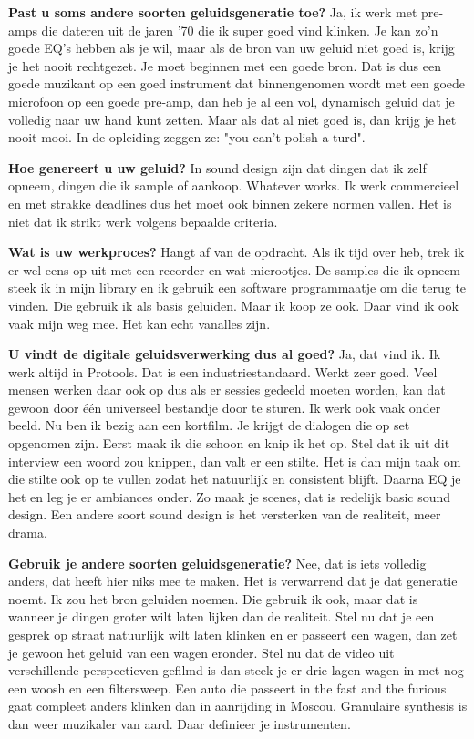 \textbf{Past u soms andere soorten geluidsgeneratie toe?}\newline
Ja, ik werk met pre-amps die dateren uit de jaren '70 die ik super goed vind klinken. Je kan zo'n goede EQ's hebben als je wil, maar als de bron van uw geluid niet goed is, krijg je het nooit rechtgezet.
Je moet beginnen met een goede bron.
Dat is dus een goede muzikant op een goed instrument dat binnengenomen wordt met een goede microfoon op een goede pre-amp, dan heb je al een vol, dynamisch geluid dat je volledig naar uw hand kunt zetten.
Maar als dat al niet goed is, dan krijg je het nooit mooi.
In de opleiding zeggen ze: "you can't polish a turd".

\textbf{Hoe genereert u uw geluid?}\newline
In sound design zijn dat dingen dat ik zelf opneem, dingen die ik sample of aankoop. Whatever works. Ik werk commercieel en met strakke deadlines dus het moet ook binnen zekere normen vallen.
Het is niet dat ik strikt werk volgens bepaalde criteria.

\textbf{Wat is uw werkproces?}\newline
Hangt af van de opdracht. Als ik tijd over heb, trek ik er wel eens op uit met een recorder en wat microotjes.
De samples die ik opneem steek ik in mijn library en ik gebruik een software programmaatje om die terug te vinden.
Die gebruik ik als basis geluiden. Maar ik koop ze ook. Daar vind ik ook vaak mijn weg mee.
Het kan echt vanalles zijn.

\textbf{U vindt de digitale geluidsverwerking dus al goed?}\newline
Ja, dat vind ik. Ik werk altijd in Protools. Dat is een industriestandaard. Werkt zeer goed.
Veel mensen werken daar ook op dus als er sessies gedeeld moeten worden, kan dat gewoon door één universeel bestandje door te sturen.
Ik werk ook vaak onder beeld. Nu ben ik bezig aan een kortfilm.
Je krijgt de dialogen die op set opgenomen zijn. Eerst maak ik die schoon en knip ik het op.
Stel dat ik uit dit interview een woord zou knippen, dan valt er een stilte. Het is dan mijn taak om die stilte ook op te vullen zodat het natuurlijk en consistent blijft.
Daarna EQ je het en leg je er ambiances onder.
Zo maak je scenes, dat is redelijk basic sound design.
Een andere soort sound design is het versterken van de realiteit, meer drama.

\textbf{Gebruik je andere soorten geluidsgeneratie?}\newline
Nee, dat is iets volledig anders, dat heeft hier niks mee te maken. Het is verwarrend dat je dat generatie noemt. Ik zou het bron geluiden noemen.
Die gebruik ik ook, maar dat is wanneer je dingen groter wilt laten lijken dan de realiteit.
Stel nu dat je een gesprek op straat natuurlijk wilt laten klinken en er passeert een wagen, dan zet je gewoon het geluid van een wagen eronder.
Stel nu dat de video uit verschillende perspectieven gefilmd is dan steek je er drie lagen wagen in met nog een woosh en een filtersweep.
Een auto die passeert in the fast and the furious gaat compleet anders klinken dan in aanrijding in Moscou.
Granulaire synthesis is dan weer muzikaler van aard. Daar definieer je instrumenten.

